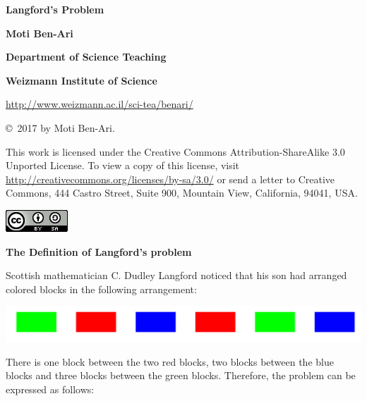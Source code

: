 \documentclass[11pt,a4paper]{report}
\begin{document}
\thispagestyle{empty}

\begin{center}

\textbf{\huge Langford's Problem}

\bigskip
\bigskip
\bigskip

\textbf{\LARGE Moti Ben-Ari}

\bigskip

\textbf{\Large Department of Science Teaching}

\bigskip

\textbf{\Large Weizmann Institute of Science}

\bigskip

\url{http://www.weizmann.ac.il/sci-tea/benari/}

\end{center}

\bigskip
\bigskip

\begin{center}
\copyright{}\  2017 by Moti Ben-Ari.
\end{center}

\begin{footnotesize}
This work is licensed under the Creative Commons Attribution-ShareAlike 3.0 Unported License. To view a copy of this license, visit \url{http://creativecommons.org/licenses/by-sa/3.0/} or send a letter to Creative Commons, 444 Castro Street, Suite 900, Mountain View, California, 94041, USA.
\end{footnotesize}

\bigskip

\begin{center}
\includegraphics[width=.2\textwidth]{../by-sa.png}
\end{center}

\newpage

\begin{center}
\textbf{\Large The Definition of Langford's problem}
\end{center}

Scottish mathematician C. Dudley Langford noticed that his son had arranged colored blocks in the following arrangement:
\begin{center}
\includegraphics[width=\textwidth]{blocks.png}
\end{center}
There is one block between the two red blocks, two blocks between the blue blocks and three blocks between the green blocks. Therefore, the problem can be expressed as follows:
\end{document}
